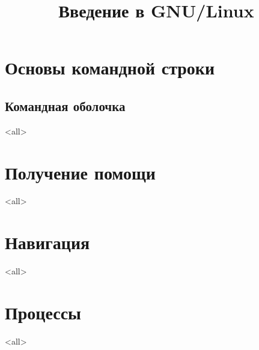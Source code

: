 

\title{Введение в GNU/Linux}







\begin{frame}
	\frametitle{}
	\titlepage
	\vspace{-0.5cm}
	\begin{center}
	\end{center}
\end{frame}
\begin{frame}
	\tableofcontents
\end{frame}


\section{Основы командной строки}
\subsection{Командная оболочка}

\mode<all>{}

\section{Получение помощи}
\mode<all>{}

\section{Навигация}
\mode<all>{}

\section{Процессы}
\mode<all>{}

